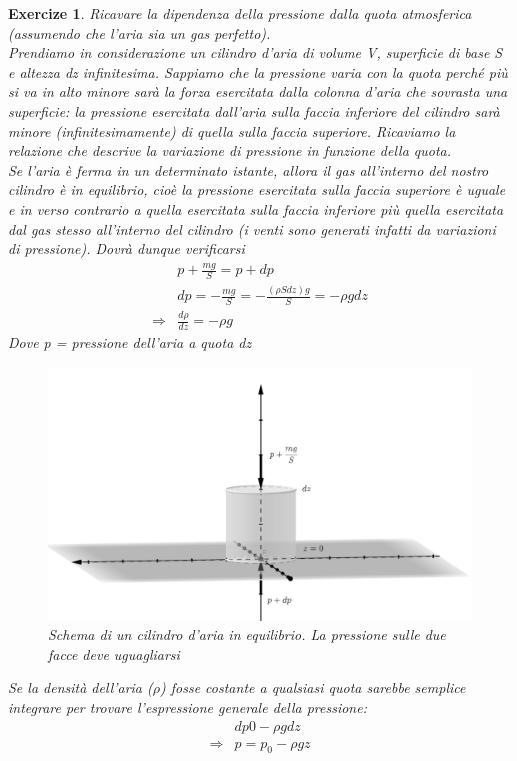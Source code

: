 \documentclass[10pt,a4paper]{article}
\newtheorem{exercize}{Exercize}
\begin{document}
\begin{exercize}
Ricavare la dipendenza della pressione dalla quota atmosferica (assumendo che l’aria sia un gas perfetto).\\
Prendiamo in considerazione un cilindro d'aria di volume V, superficie di base S e altezza dz infinitesima. Sappiamo che la pressione varia con la quota perché più si va in alto minore sarà la forza esercitata dalla colonna d'aria che sovrasta una superficie: la pressione esercitata dall'aria sulla faccia inferiore del cilindro sarà minore (infinitesimamente) di quella sulla faccia superiore. Ricaviamo la relazione che descrive la variazione di pressione in funzione della quota.\\
Se l'aria è ferma in un determinato istante, allora il gas all'interno del nostro cilindro è in equilibrio, cioè la pressione esercitata sulla faccia superiore è uguale e in verso contrario a quella esercitata sulla faccia inferiore più quella esercitata dal gas stesso all'interno del cilindro (i venti sono generati infatti da variazioni di pressione). Dovrà dunque verificarsi
\begin{align}\label{eq:stevin}
	&p + \frac{m g}{S} = p + dp \nonumber \\
	&dp = -\frac{m g}{S} = -\frac{(\rho S dz) g}{S}= -\rho g dz \nonumber \\
	\Rightarrow & \frac{d\rho}{dz}= - \rho g
\end{align}
Dove p = pressione dell'aria a quota dz
\begin{figure}[h!]
	\centering
	\includegraphics[width=0.5\linewidth]{../images/cilindro_aria}
	\caption{Schema di un cilindro d'aria in equilibrio. La pressione sulle due facce deve uguagliarsi}
	\label{fig:cilindroaria}
\end{figure}
\FloatBarrier
Se la densità dell'aria ($\rho$) fosse costante a qualsiasi quota sarebbe semplice integrare per trovare l'espressione generale della pressione:
\begin{align*}
	&dp 0 -\rho  g dz \\
	\Rightarrow & p = p_0 - \rho g z
\end{align*}

\end{exercize}
\end{document}
